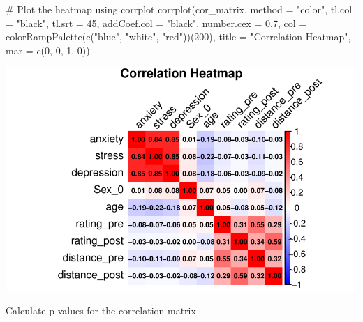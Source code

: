 \documentclass[
  letterpaper,
  DIV=11,
  numbers=noendperiod]{scrartcl}
\newenvironment{Shaded}{\begin{snugshade}}{\end{snugshade}}
\newcommand{\AttributeTok}[1]{\textcolor[rgb]{0.40,0.45,0.13}{#1}}
\newcommand{\CommentTok}[1]{\textcolor[rgb]{0.37,0.37,0.37}{#1}}
\newcommand{\DecValTok}[1]{\textcolor[rgb]{0.68,0.00,0.00}{#1}}
\newcommand{\FloatTok}[1]{\textcolor[rgb]{0.68,0.00,0.00}{#1}}
\newcommand{\FunctionTok}[1]{\textcolor[rgb]{0.28,0.35,0.67}{#1}}
\newcommand{\NormalTok}[1]{\textcolor[rgb]{0.00,0.23,0.31}{#1}}
\newcommand{\StringTok}[1]{\textcolor[rgb]{0.13,0.47,0.30}{#1}}
\begin{document}
\begin{Shaded}
\begin{Highlighting}[]
\CommentTok{\# Plot the heatmap using corrplot}
\FunctionTok{corrplot}\NormalTok{(cor\_matrix, }\AttributeTok{method =} \StringTok{"color"}\NormalTok{, }\AttributeTok{tl.col =} \StringTok{"black"}\NormalTok{, }\AttributeTok{tl.srt =} \DecValTok{45}\NormalTok{, }
         \AttributeTok{addCoef.col =} \StringTok{"black"}\NormalTok{, }\AttributeTok{number.cex =} \FloatTok{0.7}\NormalTok{, }\AttributeTok{col =} \FunctionTok{colorRampPalette}\NormalTok{(}\FunctionTok{c}\NormalTok{(}\StringTok{"blue"}\NormalTok{, }\StringTok{"white"}\NormalTok{, }\StringTok{"red"}\NormalTok{))(}\DecValTok{200}\NormalTok{),}
         \AttributeTok{title =} \StringTok{"Correlation Heatmap"}\NormalTok{, }\AttributeTok{mar =} \FunctionTok{c}\NormalTok{(}\DecValTok{0}\NormalTok{, }\DecValTok{0}\NormalTok{, }\DecValTok{1}\NormalTok{, }\DecValTok{0}\NormalTok{))}
\end{Highlighting}
\end{Shaded}

\includegraphics{index_files/figure-pdf/unnamed-chunk-31-1.pdf}

Calculate p-values for the correlation matrix
\end{document}
